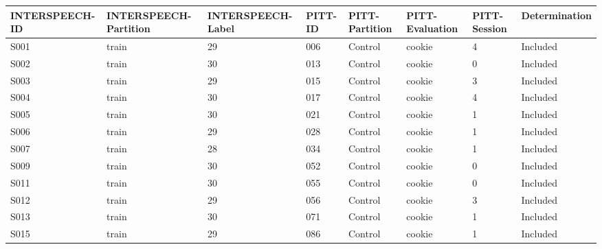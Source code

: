 \begin{center}
\tiny
\begin{longtable}{|l|l|l|l|l|l|l|l|}
\hline
INTERSPEECH-ID & INTERSPEECH-Partition & INTERSPEECH-Label & PITT-ID & PITT-Partition & PITT-Evaluation & PITT-Session & Determination \\ \hline
S001           & train                 & 29              & 006     & Control        & cookie          & 4            & Included      \\ \hline
S002           & train                 & 30              & 013     & Control        & cookie          & 0            & Included      \\ \hline
S003           & train                 & 29              & 015     & Control        & cookie          & 3            & Included      \\ \hline
S004           & train                 & 30              & 017     & Control        & cookie          & 4            & Included      \\ \hline
S005           & train                 & 30              & 021     & Control        & cookie          & 1            & Included      \\ \hline
S006           & train                 & 29              & 028     & Control        & cookie          & 1            & Included      \\ \hline
S007           & train                 & 28              & 034     & Control        & cookie          & 1            & Included      \\ \hline
S009           & train                 & 30              & 052     & Control        & cookie          & 0            & Included      \\ \hline
S011           & train                 & 30              & 055     & Control        & cookie          & 0            & Included      \\ \hline
S012           & train                 & 29              & 056     & Control        & cookie          & 3            & Included      \\ \hline
S013           & train                 & 30              & 071     & Control        & cookie          & 1            & Included      \\ \hline
S015           & train                 & 29              & 086     & Control        & cookie          & 1            & Included      \\ \hline

\end{longtable}
\end{center}
